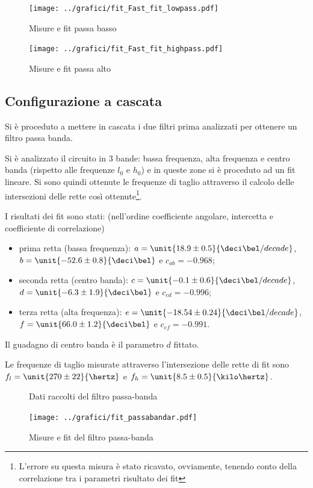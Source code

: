\documentclass[10pt,a4paper]{article}
\begin{document}
\begin{figure}[h!]
	\centering
	\begin{minipage}[c]{0.5\textwidth}
		\centering
		\texttt{[image: ../grafici/fit\_Fast\_fit\_lowpass.pdf]}
		\caption{Misure e fit passa basso}
	\end{minipage}%
	\begin{minipage}[c]{0.5\textwidth}
		\centering
		\texttt{[image: ../grafici/fit\_Fast\_fit\_highpass.pdf]}
		\caption{Misure e fit passa alto}
	\end{minipage}
\end{figure}

\subsection{Configurazione a cascata}
Si è proceduto a mettere in cascata i due filtri prima analizzati per ottenere un filtro passa banda.

Si è analizzato il circuito in 3 bande: bassa frequenza, alta frequenza e centro banda (rispetto alle frequenze $l_0$ e $h_0$) e in queste zone si è proceduto ad un fit lineare. Si sono quindi ottenute le frequenze di taglio attraverso il calcolo delle intersezioni delle rette così ottenute\footnote{L'errore su questa misura è stato ricavato, ovviamente, tenendo conto della correlazione tra i parametri risultato dei fit}.

I risultati dei fit sono stati: (nell'ordine coefficiente angolare, intercetta e coefficiente di correlazione)
\begin{itemize}
	\item prima retta (bassa frequenza): $a=\unit{18.9 \pm 0.5}{\deci\bel/decade}$,  $b=\unit{-52.6 \pm 0.8}{\deci\bel}$ e $c_{ab} =  -0.968$;
	\item seconda retta (centro banda):	$c=\unit{-0.1 \pm 0.6}{\deci\bel/decade}$, $d=\unit{-6.3 \pm 1.9}{\deci\bel}$ e $c_{cd} = -0.996$;
	\item terza retta (alta frequenza):	$e=\unit{-18.54 \pm 0.24}{\deci\bel/decade}$, $f=\unit{66.0 \pm 1.2}{\deci\bel}$ e $c_{ef} =-0.991$.
\end{itemize}
Il guadagno di centro banda è il parametro $d$ fittato.

Le frequenze di taglio misurate attraverso l'intersezione delle rette di fit sono $f_l = \unit{270 \pm 22}{\hertz}$ e $f_h = \unit{8.5 \pm 0.5}{\kilo\hertz}$.
\begin{figure}[h!]
	\centering
	\resizebox{0.6\textwidth}{!}{
	}
	\caption{Dati raccolti del filtro passa-banda}
\end{figure}
\begin{figure}[h!]
	\centering
	\texttt{[image: ../grafici/fit\_passabandar.pdf]}
	\caption{Misure e fit del filtro passa-banda}
	\label{figa9}
\end{figure}
\end{document}
